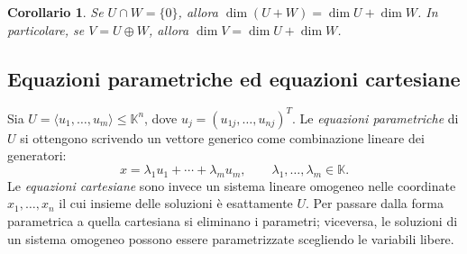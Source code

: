 \documentclass[11pt,a4paper]{article}
\newcommand{\KK}{\mathbb{K}}
\theoremstyle{plain}
\newtheorem{cor}[prop]{Corollario}
\theoremstyle{definition}
\theoremstyle{remark}
\begin{document}
\begin{cor}
Se $U\cap W=\{0\}$, allora $\dim(U+W)=\dim U+\dim W$. In particolare,
se $V=U\oplus W$, allora $\dim V=\dim U+\dim W$.
\end{cor}

\subsection{Equazioni parametriche ed equazioni cartesiane}

Sia $U=\langle u_1,\ldots,u_m\rangle\leq\KK^n$, dove
$u_j=(u_{1j},\ldots,u_{nj})^T$. Le \emph{equazioni parametriche} di $U$ si
ottengono scrivendo un vettore generico come combinazione lineare dei
generatori:
\[
 x=\lambda_1u_1+\cdots+\lambda_mu_m,\qquad \lambda_1,\ldots,\lambda_m\in\KK.
\]
Le \emph{equazioni cartesiane} sono invece un sistema lineare omogeneo nelle
coordinate $x_1,\ldots,x_n$ il cui insieme delle soluzioni è esattamente $U$.
Per passare dalla forma parametrica a quella cartesiana si eliminano i
parametri; viceversa, le soluzioni di un sistema omogeneo possono essere
parametrizzate scegliendo le variabili libere.
\end{document}
